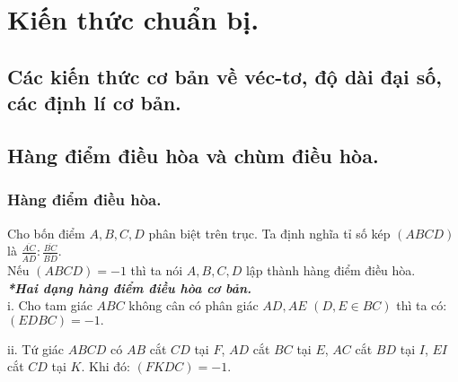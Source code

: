 \documentclass[12pt,a4paper]{article}
\begin{document}
\section{Kiến thức chuẩn bị.}
\subsection{Các kiến thức cơ bản về véc-tơ, độ dài đại số, các định lí cơ bản.}
\subsection{Hàng điểm điều hòa và chùm điều hòa.}
\subsubsection{Hàng điểm điều hòa.}
Cho bốn điểm \(A, B, C, D\) phân biệt trên trục. Ta định nghĩa tỉ số kép \(\left( {ABCD} \right)\) là \(\frac{{\overline {AC} }}{{\overline {AD} }}:\frac{{\overline {BC} }}{{\overline {BD} }}.\)\\
Nếu \(\left( {ABCD} \right) =  - 1\) thì ta nói \(A, B, C, D\) lập thành hàng điểm điều hòa.\\
\textbf{\textit{*Hai dạng hàng điểm điều hòa cơ bản.}}\\
i. Cho tam giác \(ABC\) không cân có phân giác \(AD, AE\) \(\left( {D,E \in BC} \right)\) thì ta có: \(\left( {EDBC} \right) =  - 1.\)
\begin{center}
\end{center}
ii. Tứ giác \(ABCD\) có \(AB\) cắt \(CD\) tại \(F\), \(AD\) cắt \(BC\) tại \(E\), \(AC\) cắt \(BD\) tại \(I\), \(EI\) cắt \(CD\) tại \(K\). Khi đó: \(\left( {FKDC} \right) =  - 1.\) 
\begin{center}
\end{center}
\end{document}
